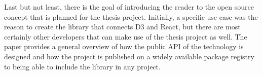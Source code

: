Last but not least, there is the goal of introducing the reader to the open source concept that is planned for the thesis project. Initially, a specific use-case was the reason to create the library that connects D3 and React, but there are most certainly other developers that can make use of the thesis project as well. The paper provides a general overview of how the public API of the technology is designed and how the project is published on a widely available package registry to being able to include the library in any project.
